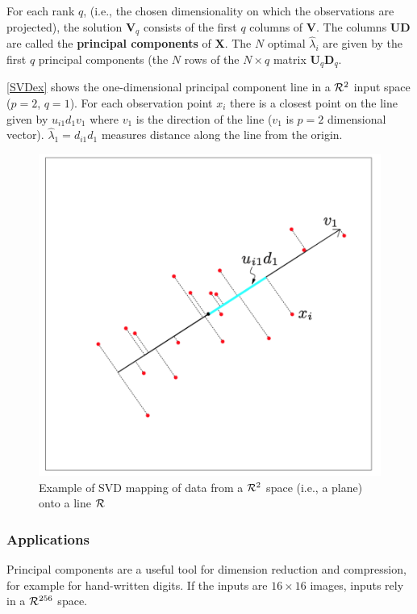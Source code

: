 \documentclass[12pt, letterpaper]{article}
\theoremstyle{definition}
\newcommand{\X}{\mathrm{\mathbf{X}}}
\begin{document}
For each rank $q$, (i.e., the chosen dimensionality on which the observations are projected), the solution $\mathbf{V}_q$  consists of the first $q$ columns of $\mathbf{V}$. The columns $\mathbf{UD}$ are called the \textbf{principal components} of $\X$. The $N$ optimal $\hat{\lambda}_i$ are given by the first $q$ principal components (the $N$ rows of the $N \times q$ matrix $\mathbf{U}_q\mathbf{D}_q$.

\autoref{SVDex} shows the one-dimensional principal component line in a $\CMcal{R}^2$ input space ($p=2$, $q=1$). For each observation point $x_i$ there is a closest point on the line given by $u_{i1}d_1v_1$ where $v_1$ is the direction of the line ($v_1$ is $p=2$ dimensional vector). $\hat{\lambda}_1=d_{i1}d_1$ measures distance along the line from the origin.

\begin{figure}
\centering
\includegraphics[scale=0.5]{img/SVD}
\caption{Example of SVD mapping of data from a $\CMcal{R}^2$ space (i.e., a plane) onto a line $\CMcal{R}$}
\label{SVDex}
\end{figure}
\subsubsection{Applications}
Principal components are a useful tool for dimension reduction and compression, for example for hand-written digits. If the inputs are $16\times 16$ images, inputs rely in  a $\CMcal{R}^{256}$ space.
\end{document}
